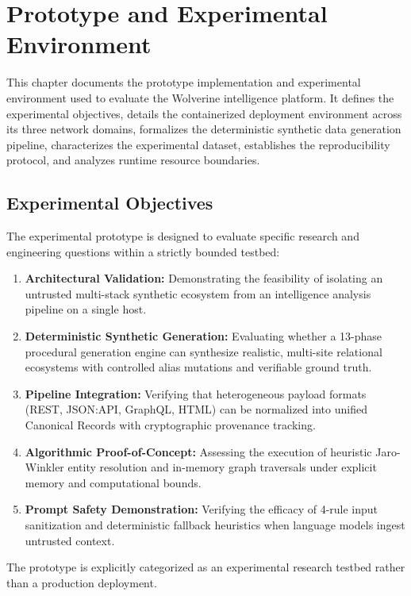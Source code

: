 \chapter{Prototype and Experimental Environment}
\label{ch:experimental-environment}

This chapter documents the prototype implementation and experimental environment used to evaluate the Wolverine intelligence platform. It defines the experimental objectives, details the containerized deployment environment across its three network domains, formalizes the deterministic synthetic data generation pipeline, characterizes the experimental dataset, establishes the reproducibility protocol, and analyzes runtime resource boundaries.

\section{Experimental Objectives}
\label{sec:exp-objectives}
The experimental prototype is designed to evaluate specific research and engineering questions within a strictly bounded testbed:
\begin{enumerate}
    \item \textbf{Architectural Validation:} Demonstrating the feasibility of isolating an untrusted multi-stack synthetic ecosystem from an intelligence analysis pipeline on a single host.
    \item \textbf{Deterministic Synthetic Generation:} Evaluating whether a 13-phase procedural generation engine can synthesize realistic, multi-site relational ecosystems with controlled alias mutations and verifiable ground truth.
    \item \textbf{Pipeline Integration:} Verifying that heterogeneous payload formats (REST, JSON:API, GraphQL, HTML) can be normalized into unified Canonical Records with cryptographic provenance tracking.
    \item \textbf{Algorithmic Proof-of-Concept:} Assessing the execution of heuristic Jaro-Winkler entity resolution and in-memory graph traversals under explicit memory and computational bounds.
    \item \textbf{Prompt Safety Demonstration:} Verifying the efficacy of 4-rule input sanitization and deterministic fallback heuristics when language models ingest untrusted context.
\end{enumerate}
The prototype is explicitly categorized as an experimental research testbed rather than a production deployment.

